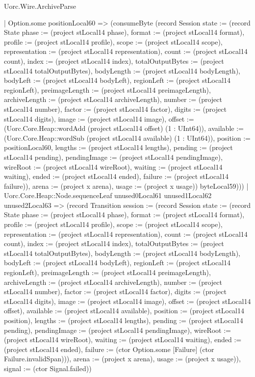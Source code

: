 \begin{lexlean}{Uorc.Wire.ArchiveParse}
\begin{semanticmodule}
{                | Option.some positionLocal60 => (consumeByte (record Session {state := (record State {phase := (project stLocal14 phase), format := (project stLocal14 format), profile := (project stLocal14 profile), scope := (project stLocal14 scope), representation := (project stLocal14 representation), count := (project stLocal14 count), index := (project stLocal14 index), totalOutputBytes := (project stLocal14 totalOutputBytes), bodyLength := (project stLocal14 bodyLength), bodyLeft := (project stLocal14 bodyLeft), regionLeft := (project stLocal14 regionLeft), preimageLength := (project stLocal14 preimageLength), archiveLength := (project stLocal14 archiveLength), number := (project stLocal14 number), factor := (project stLocal14 factor), digits := (project stLocal14 digits), image := (project stLocal14 image), offset := (Uorc.Core.Heap::wordAdd (project stLocal14 offset) (1 : UInt64)), available := (Uorc.Core.Heap::wordSub (project stLocal14 available) (1 : UInt64)), position := positionLocal60, lengths := (project stLocal14 lengths), pending := (project stLocal14 pending), pendingImage := (project stLocal14 pendingImage), wireRoot := (project stLocal14 wireRoot), waiting := (project stLocal14 waiting), ended := (project stLocal14 ended), failure := (project stLocal14 failure)}), arena := (project x arena), usage := (project x usage)}) byteLocal59)))
            | Uorc.Core.Heap::Node.sequenceLeaf unused0Local61 unused1Local62 unused2Local63 => (record Transition {session := (record Session {state := (record State {phase := (project stLocal14 phase), format := (project stLocal14 format), profile := (project stLocal14 profile), scope := (project stLocal14 scope), representation := (project stLocal14 representation), count := (project stLocal14 count), index := (project stLocal14 index), totalOutputBytes := (project stLocal14 totalOutputBytes), bodyLength := (project stLocal14 bodyLength), bodyLeft := (project stLocal14 bodyLeft), regionLeft := (project stLocal14 regionLeft), preimageLength := (project stLocal14 preimageLength), archiveLength := (project stLocal14 archiveLength), number := (project stLocal14 number), factor := (project stLocal14 factor), digits := (project stLocal14 digits), image := (project stLocal14 image), offset := (project stLocal14 offset), available := (project stLocal14 available), position := (project stLocal14 position), lengths := (project stLocal14 lengths), pending := (project stLocal14 pending), pendingImage := (project stLocal14 pendingImage), wireRoot := (project stLocal14 wireRoot), waiting := (project stLocal14 waiting), ended := (project stLocal14 ended), failure := (ctor Option.some [Failure] (ctor Failure.invalidSpan))}), arena := (project x arena), usage := (project x usage)}), signal := (ctor Signal.failed)})
}
\end{semanticmodule}
\end{lexlean}
